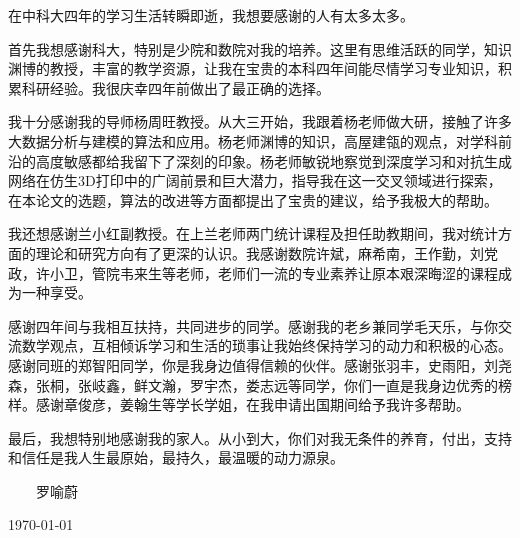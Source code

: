 
\begin{thanks}

在中科大四年的学习生活转瞬即逝，我想要感谢的人有太多太多。

首先我想感谢科大，特别是少院和数院对我的培养。这里有思维活跃的同学，知识渊博的教授，丰富的教学资源，让我在宝贵的本科四年间能尽情学习专业知识，积累科研经验。我很庆幸四年前做出了最正确的选择。

我十分感谢我的导师杨周旺教授。从大三开始，我跟着杨老师做大研，接触了许多大数据分析与建模的算法和应用。杨老师渊博的知识，高屋建瓴的观点，对学科前沿的高度敏感都给我留下了深刻的印象。杨老师敏锐地察觉到深度学习和对抗生成网络在仿生3D打印中的广阔前景和巨大潜力，指导我在这一交叉领域进行探索，在本论文的选题，算法的改进等方面都提出了宝贵的建议，给予我极大的帮助。

我还想感谢兰小红副教授。在上兰老师两门统计课程及担任助教期间，我对统计方面的理论和研究方向有了更深的认识。我感谢数院许斌，麻希南，王作勤，刘党政，许小卫，管院韦来生等老师，老师们一流的专业素养让原本艰深晦涩的课程成为一种享受。

感谢四年间与我相互扶持，共同进步的同学。感谢我的老乡兼同学毛天乐，与你交流数学观点，互相倾诉学习和生活的琐事让我始终保持学习的动力和积极的心态。感谢同班的郑智阳同学，你是我身边值得信赖的伙伴。感谢张羽丰，史雨阳，刘尧森，张桐，张岐鑫，鲜文瀚，罗宇杰，娄志远等同学，你们一直是我身边优秀的榜样。感谢章俊彦，姜翰生等学长学姐，在我申请出国期间给予我许多帮助。

最后，我想特别地感谢我的家人。从小到大，你们对我无条件的养育，付出，支持和信任是我人生最原始，最持久，最温暖的动力源泉。


\vskip 18pt

\begin{flushright}

~~~~罗喻蔚~~~~~~~~~~

\today

\end{flushright}

\end{thanks}
